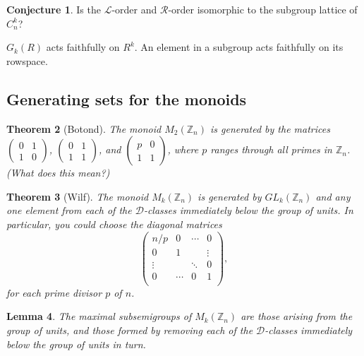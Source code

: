 \documentclass{article}
\renewcommand{\L}{\mathscr{L}}
\newcommand{\D}{\mathscr{D}}
\newcommand{\R}{\mathscr{R}}
\newtheorem{thm}{Theorem}[section]
\newtheorem{lem}[thm]{Lemma}
\theoremstyle{definition}
\newtheorem{conj}[thm]{Conjecture}
\begin{document}
\begin{conj}
  Is the $\L$-order and $\R$-order isomorphic to the subgroup lattice of
  $C_{n}^{k}$?
\end{conj}

$G_{k}(R)$ acts faithfully on $R^{k}$. An element in a subgroup acts faithfully
on its rowspace.


\subsection{Generating sets for the monoids}

\begin{thm}[Botond]
  The monoid $M_{2}(\mathbb{Z}_{n})$ is generated by the matrices
  $\begin{pmatrix}
    0 & 1\\
    1 & 0
   \end{pmatrix}$,
  $\begin{pmatrix}
    0 & 1\\
    1 & 1
   \end{pmatrix}$,
   and
  $\begin{pmatrix}
    p & 0\\
    1 & 1
   \end{pmatrix}$,
   where $p$ ranges through all primes in $\mathbb{Z}_{n}$.
   (What does this mean?)
\end{thm}

\begin{thm}[Wilf]
  The monoid $M_{k}(\mathbb{Z}_{n})$ is generated by $GL_{k}(\mathbb{Z}_{n})$ and
  any one element from each of the $\D$-classes immediately below the group of
  units. In particular, you could choose
  the diagonal matrices
  $$\begin{pmatrix}
    n/p    & 0      & \cdots & 0  \\
    0      & 1      &        & \vdots \\
    \vdots &        & \ddots & 0 \\
    0      & \cdots & 0      & 1  \\
   \end{pmatrix},$$
   for each prime divisor $p$ of $n$.
\end{thm}

\begin{lem}
  The maximal subsemigroups of $M_{k}(\mathbb{Z}_{n})$ are those arising from
  the group of units, and those formed by removing each of the
  $\D$-classes immediately below the group of units in turn.
\end{lem}
\end{document}
